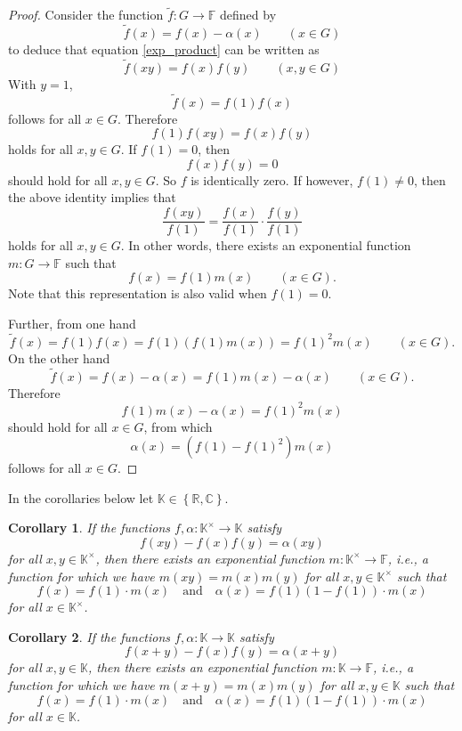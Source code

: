 \documentclass[a4paper,12pt]{article}
\theoremstyle{plain}
\newtheorem{cor}{Corollary}
\theoremstyle{definition}
\theoremstyle{remark}
\begin{document}
\begin{proof}
 Consider the function $\tilde{f}\colon G\to \mathbb{F}$ defined by 
 \[
  \tilde{f}(x)= f(x)- \alpha(x) 
  \qquad 
  \left(x\in G\right)
 \]
to deduce that equation \eqref{exp_product} can be written as 
\[
 \tilde{f}(xy)= f(x)f(y) 
 \qquad 
 \left(x, y\in G\right)
\]
With $y=1$, 
\[
 \tilde{f}(x)= f(1)f(x)
\]
follows for all $x\in G$. Therefore 
\[
 f(1)f(xy)= f(x)f(y)
\]
holds for all $x, y\in G$. If $f(1)=0$, then
\[
 f(x)f(y)=0
\]
should hold for all $x, y\in G$. So $f$ is identically zero. If however, $f(1)\neq 0$, then the above identity implies that 
\[
 \frac{f(xy)}{f(1)}= \frac{f(x)}{f(1)}\cdot \frac{f(y)}{f(1)}
\]
holds for all $x, y\in G$. In other words, there exists an exponential function $m\colon G\to \mathbb{F}$ such that 
\[
 f(x)= f(1)m(x) 
 \qquad 
 \left(x\in G\right). 
\]
Note that this representation is also valid when $f(1)=0$. 

Further, from one hand 
\[
 \tilde{f}(x)= f(1)f(x)= f(1)(f(1)m(x))= f(1)^{2}m(x) 
 \qquad 
 \left(x\in G\right). 
\]
On the other hand 
\[
 \tilde{f}(x)= f(x)-\alpha(x)= f(1)m(x)-\alpha(x)
 \qquad 
 \left(x\in G\right). 
\]
Therefore 
\[
 f(1)m(x)-\alpha(x)= f(1)^{2}m(x) 
\]
should hold for all $x\in G$, from which 
\[
 \alpha(x)= (f(1)-f(1)^{2})m(x)
\]
follows for all $x\in G$. 
\end{proof}

In the corollaries below let $\mathbb{K}\in \left\{ \mathbb{R}, \mathbb{C}\right\}$. 

\begin{cor}\label{cor11}
  If the functions $f, \alpha \colon \mathbb{K}^{\times}\to \mathbb{K}$ satisfy 
 \begin{equation}\label{eq_cor11}
 f(xy)-f(x)f(y)= \alpha(xy)  
 \end{equation}
for all $x, y\in \mathbb{K}^{\times}$, then there exists an exponential function $m\colon \mathbb{K}^{\times}\to \mathbb{F}$, i.e., a function for which we have $m(xy)=m(x)m(y)$ for all $x, y\in \mathbb{K}^{\times}$ such that 
\[
 f(x)= f(1)\cdot m(x)
 \quad 
 \text{and}
 \quad 
 \alpha(x)= f(1)(1-f(1))\cdot m(x)
\]
for all $x\in \mathbb{K}^{\times}$. 
\end{cor}


\begin{cor}\label{cor12}
  If the functions $f, \alpha \colon \mathbb{K}\to \mathbb{K}$ satisfy 
 \begin{equation}\label{eq_cor12}
 f(x+y)-f(x)f(y)= \alpha(x+y)  
 \end{equation}
for all $x, y\in \mathbb{K}$, then there exists an exponential function $m\colon \mathbb{K}\to \mathbb{F}$, i.e., a function for which we have $m(x+y)=m(x)m(y)$ for all $x, y\in \mathbb{K}$ such that 
\[
 f(x)= f(1)\cdot m(x)
 \quad 
 \text{and}
 \quad 
 \alpha(x)= f(1)(1-f(1))\cdot m(x)
\]
for all $x\in \mathbb{K}$. 
\end{cor}
\end{document}

